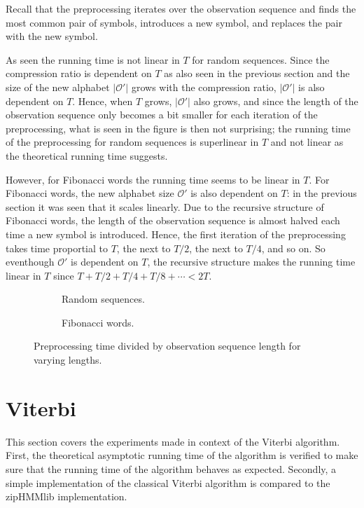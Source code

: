 Recall that the preprocessing iterates over the observation sequence and finds
the most common pair of symbols, introduces a new symbol, and replaces the pair
with the new symbol.

As seen the running time is not linear in $T$ for random sequences. Since the
compression ratio is dependent on $T$ as also seen in the previous section and
the size of the new alphabet $\lvert\mathcal{O'}\rvert$ grows with the
compression ratio, $\lvert\mathcal{O'}\rvert$ is also dependent on $T$. Hence,
when $T$ grows, $\lvert\mathcal{O'}\rvert$ also grows, and since the length of
the observation sequence only becomes a bit smaller for each iteration of the
preprocessing, what is seen in the figure is then not surprising; the running
time of the preprocessing for random sequences is superlinear in $T$ and not
linear as the theoretical running time suggests.

However, for Fibonacci words the running time seems to be linear in $T$.
For
Fibonacci words, the new alphabet size $\mathcal{O'}$ is also dependent on $T$:
in the previous section it was seen that it scales linearly. Due to the
recursive structure of Fibonacci words, the length of the observation sequence
is almost halved each time a new symbol is introduced. Hence, the first
iteration of the preprocessing takes time proportial to $T$, the next to $T/2$,
the next to $T/4$, and so on. So eventhough $\mathcal{O'}$ is dependent on $T$,
the recursive structure makes the running time linear in $T$ since
$T + T/2 + T/4 + T/8 + \cdots < 2T$.

\begin{figure}
  \centering
  \begin{subfigure}[b]{0.5\textwidth}
    \centering 
    \caption{Random sequences.}
  \end{subfigure}%
  \begin{subfigure}[b]{0.5\textwidth}
    \centering 
    \caption{Fibonacci words.}
  \end{subfigure}
  \caption{Preprocessing time divided by observation sequence length for
    varying lengths.}
  \label{fig:pre_viterbi_T}
\end{figure}

\section{Viterbi}

This section covers the experiments made in context of the Viterbi algorithm.
First, the theoretical asymptotic running time of the algorithm is verified to
make sure that the running time of the algorithm behaves as expected. Secondly,
a simple implementation of the classical Viterbi algorithm is compared to the
zipHMMlib implementation.

